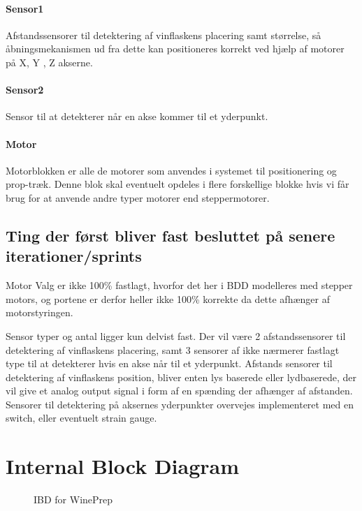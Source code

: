\paragraph{Sensor1} Afstandssensorer til detektering af vinflaskens placering samt størrelse, så åbningsmekanismen ud fra dette kan positioneres korrekt ved hjælp af motorer på X, Y , Z akserne.

\paragraph{Sensor2} Sensor til at detekterer når en akse kommer til et yderpunkt.

\paragraph{Motor} Motorblokken er alle de motorer som anvendes i systemet til positionering og prop-træk. Denne blok skal eventuelt opdeles i flere forskellige blokke hvis vi får brug for at anvende andre typer motorer end steppermotorer.

\subsection{Ting der først bliver fast besluttet på senere iterationer/sprints}

Motor Valg er ikke 100\% fastlagt, hvorfor det her i BDD modelleres med stepper motors, og portene er derfor heller ikke 100\% korrekte da dette afhænger af motorstyringen.

Sensor typer og antal ligger kun delvist fast. Der vil være 2 afstandssensorer til detektering af vinflaskens placering, samt 3 sensorer af ikke nærmerer fastlagt type til at detekterer hvis en akse når til et yderpunkt. Afstands sensorer til detektering af vinflaskens position, bliver enten lys baserede eller lydbaserede, der vil give et analog output signal i form af en spænding der afhænger af afstanden. Sensorer til detektering på aksernes yderpunkter overvejes implementeret med en switch, eller eventuelt strain gauge.

\section{Internal Block Diagram}

\begin{figure}[H]
	\centering
	\caption{IBD for WinePrep}
	\label{IBD}
\end{figure}

